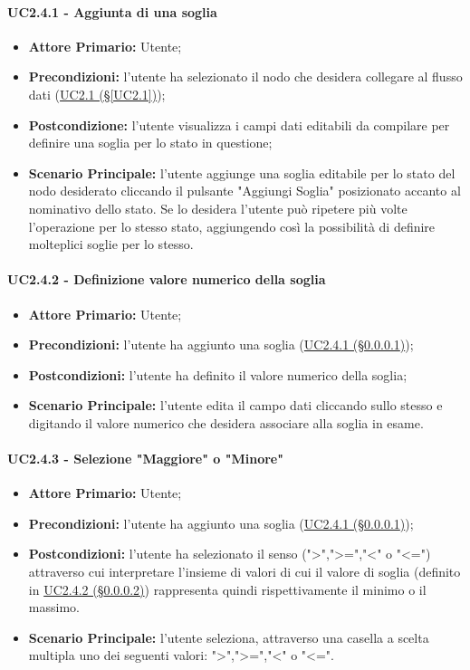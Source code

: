 \paragraph{UC2.4.1 - Aggiunta di una soglia}\label{UC2.4.1}
\begin{itemize}
	\item \textbf{Attore Primario:} Utente;
	\item \textbf{Precondizioni:} l'utente ha selezionato il nodo che desidera collegare al flusso dati 					(\hyperref[UC2.1]{UC2.1 (§\ref*{UC2.1})});
	\item \textbf{Postcondizione:} l'utente visualizza i campi dati editabili da compilare per definire una soglia per lo stato in questione;
	\item \textbf{Scenario Principale:} l'utente aggiunge una soglia editabile per lo stato del nodo desiderato cliccando il pulsante "Aggiungi Soglia" posizionato accanto al nominativo dello stato. Se lo desidera l'utente può ripetere più volte l'operazione per lo stesso stato, aggiungendo così la possibilità di definire molteplici soglie per lo stesso.
\end{itemize}

\paragraph{UC2.4.2 - Definizione valore numerico della soglia}\label{UC2.4.2}
\begin{itemize}
	\item \textbf{Attore Primario:} Utente;
	\item \textbf{Precondizioni:} l'utente ha aggiunto una soglia (\hyperref[UC2.4.1]{UC2.4.1 (§\ref*{UC2.4.1})});
	\item \textbf{Postcondizioni:} l'utente ha definito il valore numerico della soglia;
	\item \textbf{Scenario Principale:} l'utente edita il campo dati cliccando sullo stesso e digitando il valore numerico che desidera associare alla soglia in esame.
\end{itemize}

\paragraph{UC2.4.3 - Selezione "Maggiore" o "Minore"}\label{UC2.4.3}
\begin{itemize}
	\item \textbf{Attore Primario:} Utente;
	\item \textbf{Precondizioni:} l'utente ha aggiunto una soglia (\hyperref[UC2.4.1]{UC2.4.1 (§\ref*{UC2.4.1})});
	\item \textbf{Postcondizioni:} l'utente ha selezionato il senso (">",">=","<" o "<=") attraverso cui interpretare l'insieme di valori di cui il valore di soglia (definito in \hyperref[UC2.4.2]{UC2.4.2 (§\ref*{UC2.4.2})}) rappresenta quindi rispettivamente il minimo o il massimo.
	\item \textbf{Scenario Principale:} l'utente seleziona, attraverso una casella a scelta multipla uno dei seguenti valori: ">",">=","<" o "<=".
\end{itemize}

